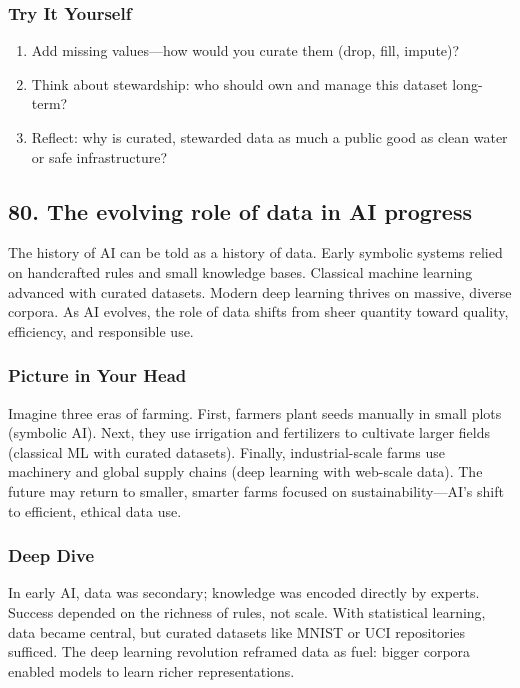 \documentclass[
  letterpaper,
  DIV=11,
  numbers=noendperiod]{scrreprt}
\providecommand{\tightlist}{%
  \setlength{\itemsep}{0pt}\setlength{\parskip}{0pt}}
\begin{document}
\subsubsection{Try It Yourself}\label{try-it-yourself-78}

\begin{enumerate}
\def\labelenumi{\arabic{enumi}.}
\tightlist
\item
  Add missing values---how would you curate them (drop, fill, impute)?
\item
  Think about stewardship: who should own and manage this dataset
  long-term?
\item
  Reflect: why is curated, stewarded data as much a public good as clean
  water or safe infrastructure?
\end{enumerate}

\subsection{80. The evolving role of data in AI
progress}\label{the-evolving-role-of-data-in-ai-progress}

The history of AI can be told as a history of data. Early symbolic
systems relied on handcrafted rules and small knowledge bases. Classical
machine learning advanced with curated datasets. Modern deep learning
thrives on massive, diverse corpora. As AI evolves, the role of data
shifts from sheer quantity toward quality, efficiency, and responsible
use.

\subsubsection{Picture in Your Head}\label{picture-in-your-head-79}

Imagine three eras of farming. First, farmers plant seeds manually in
small plots (symbolic AI). Next, they use irrigation and fertilizers to
cultivate larger fields (classical ML with curated datasets). Finally,
industrial-scale farms use machinery and global supply chains (deep
learning with web-scale data). The future may return to smaller, smarter
farms focused on sustainability---AI's shift to efficient, ethical data
use.

\subsubsection{Deep Dive}\label{deep-dive-79}

In early AI, data was secondary; knowledge was encoded directly by
experts. Success depended on the richness of rules, not scale. With
statistical learning, data became central, but curated datasets like
MNIST or UCI repositories sufficed. The deep learning revolution
reframed data as fuel: bigger corpora enabled models to learn richer
representations.
\end{document}
